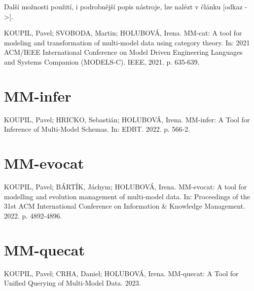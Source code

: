 Další možnosti použití, i podrobnější popis nástroje, lze nalézt v článku [odkaz ->].

KOUPIL, Pavel; SVOBODA, Martin; HOLUBOVÁ, Irena. MM-cat: A tool for modeling and transformation of multi-model data using category theory. In: 2021 ACM/IEEE International Conference on Model Driven Engineering Languages and Systems Companion (MODELS-C). IEEE, 2021. p. 635-639.



\section{MM-infer}

KOUPIL, Pavel; HRICKO, Sebastián; HOLUBOVÁ, Irena. MM-infer: A Tool for Inference of Multi-Model Schemas. In: EDBT. 2022. p. 566-2.




\section{MM-evocat}

KOUPIL, Pavel; BÁRTÍK, Jáchym; HOLUBOVÁ, Irena. MM-evocat: A tool for modelling and evolution management of multi-model data. In: Proceedings of the 31st ACM International Conference on Information \& Knowledge Management. 2022. p. 4892-4896.


\section{MM-quecat}

KOUPIL, Pavel; CRHA, Daniel; HOLUBOVÁ, Irena. MM-quecat: A Tool for Unified Querying of Multi-Model Data. 2023.
